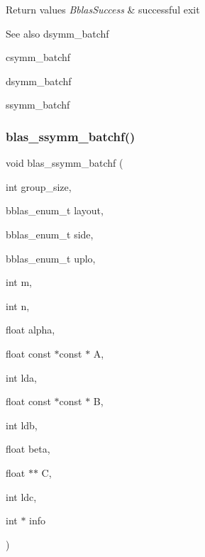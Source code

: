\begin{DoxyRetVals}{Return values}
{\em Bblas\+Success} & successful exit\\
\hline
\end{DoxyRetVals}
\begin{DoxySeeAlso}{See also}
dsymm\+\_\+batchf 

csymm\+\_\+batchf 

dsymm\+\_\+batchf 

ssymm\+\_\+batchf 
\end{DoxySeeAlso}
\mbox{\label{group__symm__batchf_gad73d6157baa333e8b81127d9fb0e73c7}} 
\subsubsection{\texorpdfstring{blas\+\_\+ssymm\+\_\+batchf()}{blas\_ssymm\_batchf()}}
{\footnotesize\ttfamily void blas\+\_\+ssymm\+\_\+batchf (\begin{DoxyParamCaption}\item[{int}]{group\+\_\+size,  }\item[{bblas\+\_\+enum\+\_\+t}]{layout,  }\item[{bblas\+\_\+enum\+\_\+t}]{side,  }\item[{bblas\+\_\+enum\+\_\+t}]{uplo,  }\item[{int}]{m,  }\item[{int}]{n,  }\item[{float}]{alpha,  }\item[{float const $\ast$const $\ast$}]{A,  }\item[{int}]{lda,  }\item[{float const $\ast$const $\ast$}]{B,  }\item[{int}]{ldb,  }\item[{float}]{beta,  }\item[{float $\ast$$\ast$}]{C,  }\item[{int}]{ldc,  }\item[{int $\ast$}]{info }\end{DoxyParamCaption})}

